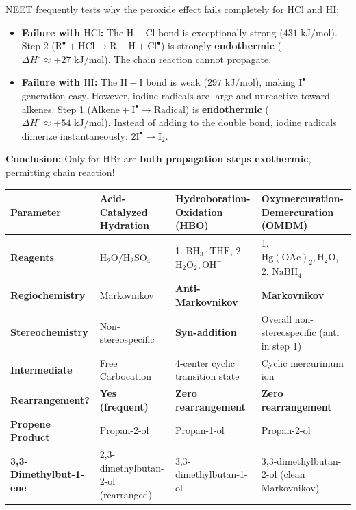 \documentclass[10pt,a4paper]{article}
\begin{document}
\begin{trapbox}
NEET frequently tests why the peroxide effect fails completely for $\mathrm{HCl}$ and $\mathrm{HI}$:
\begin{itemize}
  \item \textbf{Failure with $\mathrm{HCl}$:} The $\mathrm{H-Cl}$ bond is exceptionally strong ($431\text{ kJ/mol}$). Step 2 ($\mathrm{R^\bullet + HCl \to R-H + Cl^\bullet}$) is strongly \textbf{endothermic} ($\Delta H^\circ \approx +27\text{ kJ/mol}$). The chain reaction cannot propagate.
  \item \textbf{Failure with $\mathrm{HI}$:} The $\mathrm{H-I}$ bond is weak ($297\text{ kJ/mol}$), making $\mathrm{I}^\bullet$ generation easy. However, iodine radicals are large and unreactive toward alkenes: Step 1 ($\mathrm{Alkene + I^\bullet \to Radical}$) is \textbf{endothermic} ($\Delta H^\circ \approx +54\text{ kJ/mol}$). Instead of adding to the double bond, iodine radicals dimerize instantaneously: $2\mathrm{I}^\bullet \to \mathrm{I_2}$.
\end{itemize}
\textbf{Conclusion:} Only for $\mathrm{HBr}$ are \textbf{both propagation steps exothermic}, permitting chain reaction!
\end{trapbox}

\begin{usecasebox}
\begin{tabularx}{\linewidth}{|l|Y|Y|Y|}
\hline
\textbf{Parameter} & \textbf{Acid-Catalyzed Hydration} & \textbf{Hydroboration-Oxidation (HBO)} & \textbf{Oxymercuration-Demercuration (OMDM)} \\
\hline
\textbf{Reagents} & $\mathrm{H_2O / H_2SO_4}$ & 1. $\mathrm{BH_3\cdot THF}$, 2. $\mathrm{H_2O_2, OH^-}$ & 1. $\mathrm{Hg(OAc)_2, H_2O}$, 2. $\mathrm{NaBH_4}$ \\
\hline
\textbf{Regiochemistry} & Markovnikov & \textbf{Anti-Markovnikov} & \textbf{Markovnikov} \\
\hline
\textbf{Stereochemistry} & Non-stereospecific & \textbf{Syn-addition} & Overall non-stereospecific (anti in step 1) \\
\hline
\textbf{Intermediate} & Free Carbocation & 4-center cyclic transition state & Cyclic mercurinium ion \\
\hline
\textbf{Rearrangement?} & \textbf{Yes (frequent)} & \textbf{Zero rearrangement} & \textbf{Zero rearrangement} \\
\hline
\textbf{Propene Product} & Propan-2-ol & Propan-1-ol & Propan-2-ol \\
\hline
\textbf{3,3-Dimethylbut-1-ene} & 2,3-dimethylbutan-2-ol (rearranged) & 3,3-dimethylbutan-1-ol & 3,3-dimethylbutan-2-ol (clean Markovnikov) \\
\hline
\end{tabularx}
\end{usecasebox}
\end{document}
